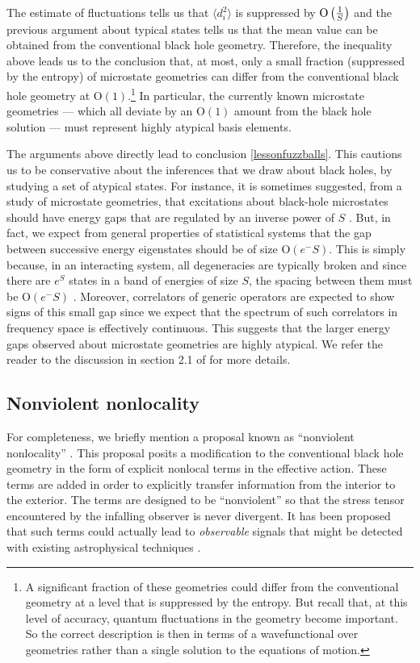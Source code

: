 \documentclass[12pt]{article}
\def\Or[#1]{{\text{O}}\left({#1}\right)}
\begin{document}
The estimate of fluctuations tells us  that $\langle d_i^2 \rangle$ is suppressed by $\Or[{1 \over S}]$ and the previous argument about typical states tells us that the mean value can be obtained from the conventional black hole geometry. Therefore, the inequality above leads us to the conclusion that, at most,  only a small fraction (suppressed by the entropy) of microstate geometries can differ from the conventional black hole geometry at $\Or[1]$.\footnote{A significant fraction of these geometries could differ from the conventional geometry at a level that is suppressed by the entropy. But recall that, at this level of accuracy,   quantum fluctuations in the geometry become important. So the correct description is then in terms of a wavefunctional over geometries rather than a single solution to the equations of motion.}
In particular, the currently known  microstate geometries --- which all deviate by an $\Or[1]$ amount from the black hole solution --- must represent highly atypical basis elements.

The arguments above directly lead to conclusion \ref{lessonfuzzballs}. This cautions us to be conservative about the inferences that we draw about black holes, by studying a set of atypical states. For instance, it is sometimes suggested, from a study of microstate geometries, that  excitations about black-hole microstates should have energy gaps that are regulated by an inverse power of $S$ \cite{Tyukov:2017uig}.  But, in fact, we expect from general properties of statistical systems that the gap between successive energy eigenstates should be of size $\Or[e^{-S}]$.
This is simply because, in an interacting system, all degeneracies are typically broken and since there are $e^{S}$ states in a band of energies of size $S$, the spacing between them must be $\Or[e^{-S}]$ \cite{casati1985energy,berry1977level}. Moreover, correlators of generic operators are expected to show signs of this small gap since we expect that the spectrum of such correlators in frequency space is effectively continuous.  This suggests that the larger energy gaps observed about microstate geometries are highly atypical.
We refer the reader to the discussion in section 2.1 of \cite{Raju:2018xue} for more details.





\subsection{Nonviolent nonlocality}
For completeness, we briefly mention a proposal known as ``nonviolent nonlocality'' \cite{Giddings:2012gc}. This proposal posits a modification to the conventional black hole geometry in the form of explicit nonlocal terms in the effective action. These terms are added in order to explicitly transfer information from the interior to the exterior. The terms are designed to be ``nonviolent'' so that the stress tensor encountered by the infalling observer is never divergent. It has been proposed that such terms could actually lead to {\em observable} signals that might be detected  with existing astrophysical techniques \cite{Giddings:2019jwy}.
\end{document}

